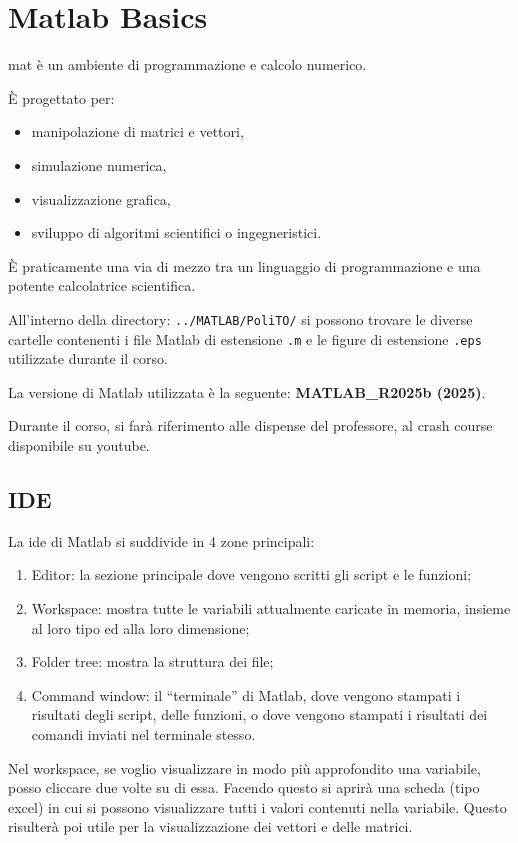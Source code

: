 \section{Matlab Basics}
\gls{mat} è un ambiente di programmazione e calcolo numerico.

È progettato per:
\begin{itemize}
    \item  manipolazione di matrici e vettori,
    \item  simulazione numerica,
    \item  visualizzazione grafica,
    \item  sviluppo di algoritmi scientifici o ingegneristici.
\end{itemize}
È praticamente una via di mezzo tra un linguaggio di programmazione e una potente calcolatrice scientifica.

All'interno della directory: \verb|../MATLAB/PoliTO/| si possono trovare le diverse cartelle contenenti i file Matlab di estensione \verb|.m| e le figure di estensione \verb|.eps| utilizzate durante il corso.

La versione di Matlab utilizzata è la seguente: \textbf{MATLAB\_R2025b (2025)}.

Durante il corso, si farà riferimento alle dispense del professore, al crash course~\cite{crashcourse} disponibile su youtube.

%
\subsection{IDE}
La \gls{ide} di Matlab si suddivide in 4 zone principali:
\begin{enumerate}
    \item Editor: la sezione principale dove vengono scritti gli script e le funzioni;
    \item Workspace: mostra tutte le variabili attualmente caricate in memoria, insieme al loro tipo ed alla loro dimensione;
    \item Folder tree: mostra la struttura dei file;
    \item Command window: il ``terminale'' di Matlab, dove vengono stampati i risultati degli script, delle funzioni, o dove vengono stampati i risultati dei comandi inviati nel terminale stesso.
\end{enumerate}
\begin{note}
    Nel workspace, se voglio visualizzare in modo più approfondito una variabile, posso cliccare due volte su di essa. Facendo questo si aprirà una scheda (tipo excel) in cui si possono visualizzare tutti i valori contenuti nella variabile. Questo risulterà poi utile per la visualizzazione dei vettori e delle matrici.
\end{note}
%


